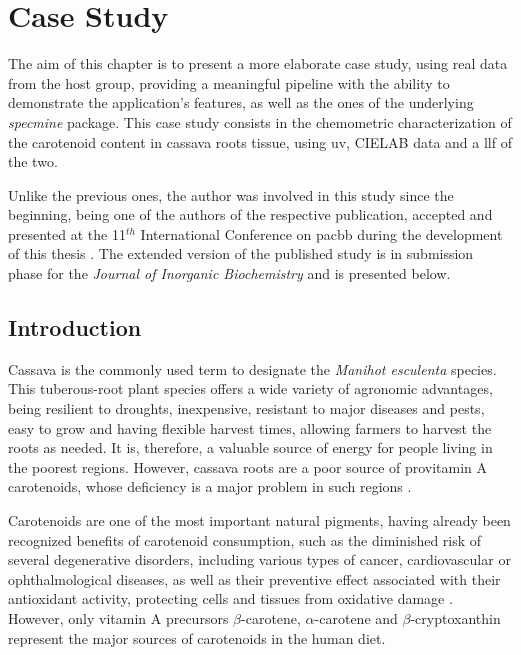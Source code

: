 
\chapter{Case Study} \label{case_study}

The aim of this chapter is to present a more elaborate case study, using real data from the host group, providing a meaningful pipeline with the ability to demonstrate the application's features, as well as the ones of the underlying \textit{specmine} package. This case study consists in the chemometric characterization of the carotenoid content in cassava roots tissue, using \gls{uv}, CIELAB data and a \acrfull{llf} of the two.

Unlike the previous ones, the author was involved in this study since the beginning, being one of the authors of the respective publication, accepted and presented at the 11$^{th}$ International Conference on \gls{pacbb} during the development of this thesis \citep{moresco2017classification}. The extended version of the published study is in submission phase for the \textit{Journal of Inorganic Biochemistry} and is presented below.


\section{Introduction}

Cassava is the commonly used term to designate the \textit{Manihot esculenta} species. This tuberous-root plant species offers a wide variety of agronomic advantages, being resilient to droughts, inexpensive, resistant to major diseases and pests, easy to grow and having flexible harvest times, allowing farmers to harvest the roots as needed. It is, therefore, a valuable source of energy for people living in the poorest regions. However, cassava roots are a poor source of provitamin A carotenoids, whose deficiency is a major problem in such regions \citep{la2013biofortified, sanchez2014prediction}. 

Carotenoids are one of the most important natural pigments, having already been recognized benefits of carotenoid consumption, such as the diminished risk of several degenerative disorders, including various types of cancer, cardiovascular or ophthalmological diseases, as well as their preventive effect associated with their antioxidant activity, protecting cells and tissues from oxidative damage \citep{stahl2003antioxidant}. However, only vitamin A precursors $\beta$-carotene, $\alpha$-carotene and $\beta$-cryptoxanthin represent the major sources of carotenoids in the human diet.

